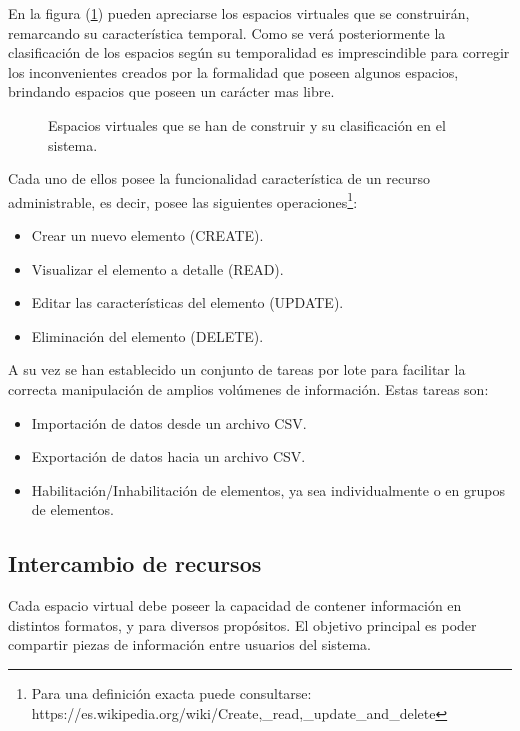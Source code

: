 En la figura (\ref{espacios}) pueden apreciarse los espacios virtuales que se
construirán, remarcando su característica temporal. Como se verá posteriormente
la clasificación de los espacios según su temporalidad es imprescindible para
corregir los inconvenientes creados por la formalidad que poseen algunos
espacios, brindando espacios que poseen un carácter mas libre.

\begin{figure}
\centering

\caption{Espacios virtuales que se han de construir y su clasificación en el
sistema.}
\label{espacios}
\end{figure}

Cada uno de ellos posee la funcionalidad característica de un recurso
administrable, es decir, posee las siguientes operaciones\footnote{Para una
definición exacta puede consultarse:
https://es.wikipedia.org/wiki/Create,\_read,\_update\_and\_delete}:

\begin{itemize}
\item Crear un nuevo elemento (CREATE).
\item Visualizar el elemento a detalle (READ).
\item Editar las características del elemento (UPDATE).
\item Eliminación del elemento (DELETE).
\end{itemize}

A su vez se han establecido un conjunto de tareas por lote para facilitar la
correcta manipulación de amplios volúmenes de información. Estas tareas son:

\begin{itemize}
\item Importación de datos desde un archivo CSV.
\item Exportación de datos hacia un archivo CSV.
\item Habilitación/Inhabilitación de elementos, ya sea individualmente o en
      grupos de elementos.
\end{itemize}

\subsection{Intercambio de recursos}

Cada espacio virtual debe poseer la capacidad de contener información en
distintos formatos, y para diversos propósitos. El objetivo principal es poder
compartir piezas de información entre usuarios del sistema.

